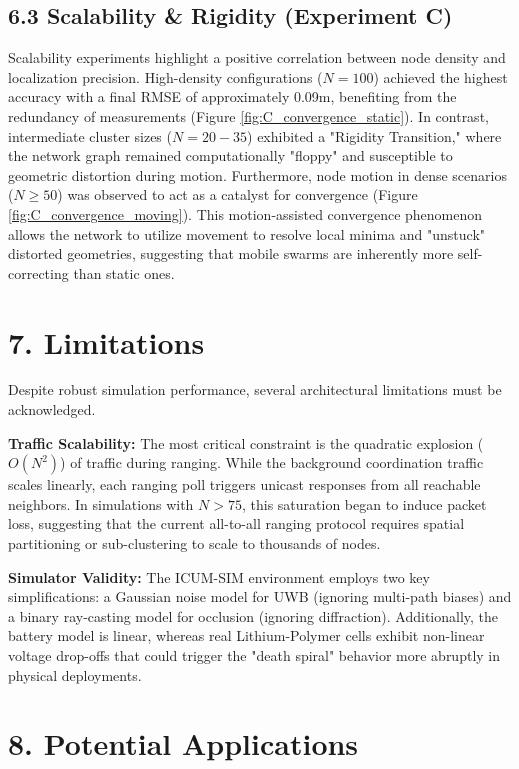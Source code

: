\subsection*{6.3 Scalability & Rigidity (Experiment C)}
\noindent Scalability experiments highlight a positive correlation between node density and localization precision. High-density configurations ($N=100$) achieved the highest accuracy with a final RMSE of approximately 0.09m, benefiting from the redundancy of measurements (Figure \ref{fig:C_convergence_static}). In contrast, intermediate cluster sizes ($N=20-35$) exhibited a "Rigidity Transition," where the network graph remained computationally "floppy" and susceptible to geometric distortion during motion.
\noindent Furthermore, node motion in dense scenarios ($N \ge 50$) was observed to act as a catalyst for convergence (Figure \ref{fig:C_convergence_moving}). This motion-assisted convergence phenomenon allows the network to utilize movement to resolve local minima and "unstuck" distorted geometries, suggesting that mobile swarms are inherently more self-correcting than static ones.

\section*{7. Limitations}

\noindent Despite robust simulation performance, several architectural limitations must be acknowledged.

\noindent \textbf{Traffic Scalability:} The most critical constraint is the quadratic explosion ($O(N^2)$) of traffic during ranging. While the background coordination traffic scales linearly, each ranging poll triggers unicast responses from all reachable neighbors. In simulations with $N > 75$, this saturation began to induce packet loss, suggesting that the current all-to-all ranging protocol requires spatial partitioning or sub-clustering to scale to thousands of nodes.

\noindent \textbf{Simulator Validity:} The ICUM-SIM environment employs two key simplifications: a Gaussian noise model for UWB (ignoring multi-path biases) and a binary ray-casting model for occlusion (ignoring diffraction). Additionally, the battery model is linear, whereas real Lithium-Polymer cells exhibit non-linear voltage drop-offs that could trigger the "death spiral" behavior more abruptly in physical deployments.

\section*{8. Potential Applications}

